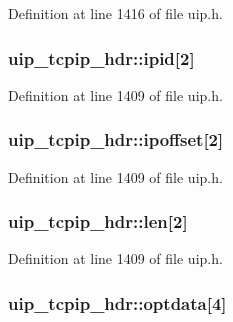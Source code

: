 Definition at line 1416 of file uip.h.

\hypertarget{structuip__tcpip__hdr_a7a59f0dad059786238d8ab604630e7f3}{
\subsubsection[{ipid}]{ {\bf uip\_\-tcpip\_\-hdr::ipid}\mbox{[}2\mbox{]}}}
\label{structuip__tcpip__hdr_a7a59f0dad059786238d8ab604630e7f3}


Definition at line 1409 of file uip.h.

\hypertarget{structuip__tcpip__hdr_a85d7f35662f7be20cd84e789a290dd4b}{
\subsubsection[{ipoffset}]{ {\bf uip\_\-tcpip\_\-hdr::ipoffset}\mbox{[}2\mbox{]}}}
\label{structuip__tcpip__hdr_a85d7f35662f7be20cd84e789a290dd4b}


Definition at line 1409 of file uip.h.

\hypertarget{structuip__tcpip__hdr_ae57281f5bef284bc9545834ef8ed4a96}{
\subsubsection[{len}]{ {\bf uip\_\-tcpip\_\-hdr::len}\mbox{[}2\mbox{]}}}
\label{structuip__tcpip__hdr_ae57281f5bef284bc9545834ef8ed4a96}


Definition at line 1409 of file uip.h.

\hypertarget{structuip__tcpip__hdr_adde3cf9a57445814d01b3c67da08afdb}{
\subsubsection[{optdata}]{ {\bf uip\_\-tcpip\_\-hdr::optdata}\mbox{[}4\mbox{]}}}
\label{structuip__tcpip__hdr_adde3cf9a57445814d01b3c67da08afdb}


